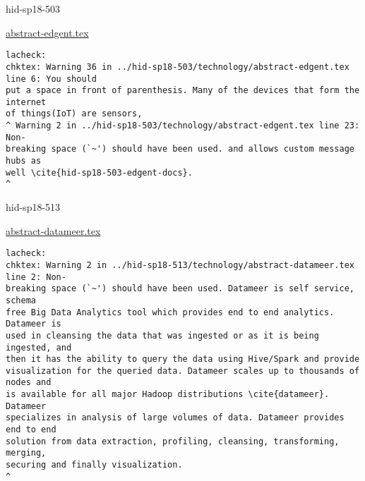 

\begin{IU}

hid-sp18-503

\href{https://github.com/cloudmesh-community/hid-sp18-503/blob/master//technology/abstract-edgent.tex}{abstract-edgent.tex}

\begin{tiny}
\begin{verbatim}
lacheck: 
chktex: Warning 36 in ../hid-sp18-503/technology/abstract-edgent.tex line 6: You should
put a space in front of parenthesis. Many of the devices that form the internet
of things(IoT) are sensors,
^ Warning 2 in ../hid-sp18-503/technology/abstract-edgent.tex line 23: Non-
breaking space (`~') should have been used. and allows custom message hubs as
well \cite{hid-sp18-503-edgent-docs}.                                         ^
\end{verbatim}
\end{tiny}
\end{IU}



\begin{IU}

hid-sp18-513

\href{https://github.com/cloudmesh-community/hid-sp18-513/blob/master//technology/abstract-datameer.tex}{abstract-datameer.tex}

\begin{tiny}
\begin{verbatim}
lacheck: 
chktex: Warning 2 in ../hid-sp18-513/technology/abstract-datameer.tex line 2: Non-
breaking space (`~') should have been used. Datameer is self service, schema
free Big Data Analytics tool which provides end to end analytics. Datameer is
used in cleansing the data that was ingested or as it is being ingested, and
then it has the ability to query the data using Hive/Spark and provide
visualization for the queried data. Datameer scales up to thousands of nodes and
is available for all major Hadoop distributions \cite{datameer}. Datameer
specializes in analysis of large volumes of data. Datameer provides end to end
solution from data extraction, profiling, cleansing, transforming, merging,
securing and finally visualization.
^
\end{verbatim}
\end{tiny}
\end{IU}

